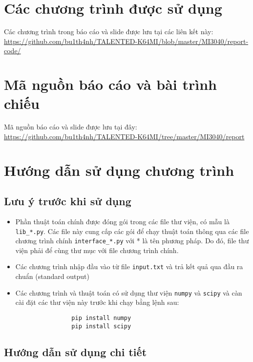 \newpage
\appendix
\addappheadtotoc
\renewcommand{\thesection}{\Alph{section}}
\section{Các chương trình được sử dụng}
    \par Các chương trình trong báo cáo và slide được lưu tại các liên kết này: \url{https://github.com/bu1th4nh/TALENTED-K64MI/blob/master/MI3040/report-code/} 

\section{Mã nguồn báo cáo và bài trình chiếu}
    \par Mã nguồn báo cáo và slide được lưu tại đây: \url{https://github.com/bu1th4nh/TALENTED-K64MI/tree/master/MI3040/report}

\section{Hướng dẫn sử dụng chương trình}

    \subsection{Lưu ý trước khi sử dụng}

        \begin{itemize}
            \item Phần thuật toán chính được đóng gói trong các file thư viện, có mẫu là \texttt{lib\_*.py}. Các file này cung cấp các gói để chạy thuật toán thông qua các file chương trình chính \texttt{interface\_*.py} với * là tên phương pháp. Do đó, file thư viện phải để cùng thư mục với file chương trình chính.
            \item Các chương trình nhập đầu vào từ file \texttt{input.txt} và trả kết quả qua đầu ra chuẩn (standard output)
            \item Các chương trình và thuật toán có sử dụng thư viện \texttt{numpy} và \texttt{scipy} và càn cài đặt các thư viện này trước khi chạy bằng lệnh sau:
            \begin{verbatim}
                pip install numpy
                pip install scipy
            \end{verbatim}
        \end{itemize}

    \subsection{Hướng dẫn sử dụng chi tiết}

